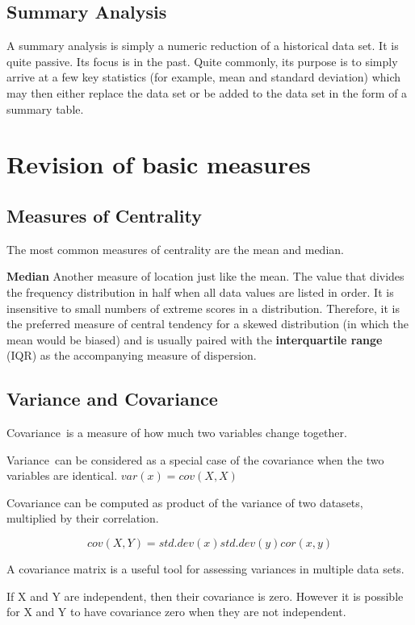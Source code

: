 \newpage


\subsection{Summary Analysis}
A summary analysis is simply a numeric reduction of a historical data set. It is quite passive. Its focus is in the past. Quite commonly, its purpose is to simply arrive at a few key statistics (for example, mean and standard deviation) which may then either replace the data set or be added to the data set in the form of a summary table.

\section{Revision of basic measures}

\subsection{Measures of Centrality}
The most common measures of centrality are the mean and median.

\textbf{Median} Another measure of location just like the mean. The value that divides the frequency distribution in half when all data values are listed in order. It is insensitive to small numbers of extreme scores in a distribution. Therefore, it is the preferred measure of central tendency for a skewed distribution (in which the mean would be biased) and is usually paired with the \textbf{interquartile range} (IQR) as the accompanying measure of dispersion.

\subsection{Variance and Covariance}
Covariance is a measure of how much two variables change together. 

Variance can be considered as a special case of the covariance when the two variables are identical.
$var(x) = cov(X,X)$

Covariance can be computed as product of the variance of two datasets, multiplied by their correlation.

\[
cov(X,Y) = std.dev (x) std.dev(y) cor(x,y)
\]

A covariance matrix is a useful tool for assessing variances in multiple data sets.


If X and Y are independent, then their covariance is zero. However it is possible for X and Y to have covariance zero when they are not independent.






